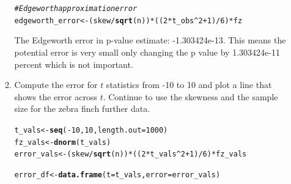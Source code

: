 \documentclass{article}\usepackage[]{graphicx}\usepackage[]{xcolor}
\makeatletter
\newcommand{\hlnum}[1]{\textcolor[rgb]{0.686,0.059,0.569}{#1}}%
\newcommand{\hlcom}[1]{\textcolor[rgb]{0.678,0.584,0.686}{\textit{#1}}}%
\newcommand{\hlopt}[1]{\textcolor[rgb]{0,0,0}{#1}}%
\newcommand{\hldef}[1]{\textcolor[rgb]{0.345,0.345,0.345}{#1}}%
\newcommand{\hlkwb}[1]{\textcolor[rgb]{0.69,0.353,0.396}{#1}}%
\newcommand{\hlkwc}[1]{\textcolor[rgb]{0.333,0.667,0.333}{#1}}%
\newcommand{\hlkwd}[1]{\textcolor[rgb]{0.737,0.353,0.396}{\textbf{#1}}}%
\newenvironment{kframe}{%
 \def\at@end@of@kframe{}%
 \ifinner\ifhmode%
  \def\at@end@of@kframe{\end{minipage}}%
  \begin{minipage}{\columnwidth}%
 \fi\fi%
 \def\FrameCommand##1{\hskip\@totalleftmargin \hskip-\fboxsep
 \colorbox{shadecolor}{##1}\hskip-\fboxsep
     \hskip-\linewidth \hskip-\@totalleftmargin \hskip\columnwidth}%
 \MakeFramed {\advance\hsize-\width
   \@totalleftmargin\z@ \linewidth\hsize
   \@setminipage}}%
 {\par\unskip\endMakeFramed%
 \at@end@of@kframe}
\newenvironment{knitrout}{}{} %
\makeatother
\begin{document}
\begin{enumerate}
\begin{enumerate}
\begin{knitrout}
\begin{kframe}
\begin{alltt}
\hlcom{# Edgeworth approximation error}
\hldef{edgeworth_error} \hlkwb{<-} \hldef{(skew} \hlopt{/} \hlkwd{sqrt}\hldef{(n))} \hlopt{*} \hldef{((}\hlnum{2} \hlopt{*} \hldef{t_obs}\hlopt{^}\hlnum{2} \hlopt{+} \hlnum{1}\hldef{)} \hlopt{/} \hlnum{6}\hldef{)} \hlopt{*} \hldef{fz}
\end{alltt}
\end{kframe}
\end{knitrout}
The Edgeworth error in p-value estimate: -1.303424e-13. This means the potential error is very small only changing the p value by 1.303424e-11 percent which is not important. 
  \item Compute the error for $t$ statistics from -10 to 10 and plot a line
  that shows the error across $t$. Continue to use the skewness and 
  the sample size for the zebra finch further data.
\begin{knitrout}
\color{fgcolor}\begin{kframe}
\begin{alltt}
\hldef{t_vals} \hlkwb{<-} \hlkwd{seq}\hldef{(}\hlopt{-}\hlnum{10}\hldef{,} \hlnum{10}\hldef{,} \hlkwc{length.out} \hldef{=} \hlnum{1000}\hldef{)}
\hldef{fz_vals} \hlkwb{<-} \hlkwd{dnorm}\hldef{(t_vals)}
\hldef{error_vals} \hlkwb{<-} \hldef{(skew} \hlopt{/} \hlkwd{sqrt}\hldef{(n))} \hlopt{*} \hldef{((}\hlnum{2} \hlopt{*} \hldef{t_vals}\hlopt{^}\hlnum{2} \hlopt{+} \hlnum{1}\hldef{)} \hlopt{/} \hlnum{6}\hldef{)} \hlopt{*} \hldef{fz_vals}

\hldef{error_df} \hlkwb{<-} \hlkwd{data.frame}\hldef{(}\hlkwc{t} \hldef{= t_vals,} \hlkwc{error} \hldef{= error_vals)}


\end{alltt}
\end{kframe}
\end{knitrout}
\end{enumerate}
\end{enumerate}
\end{document}
